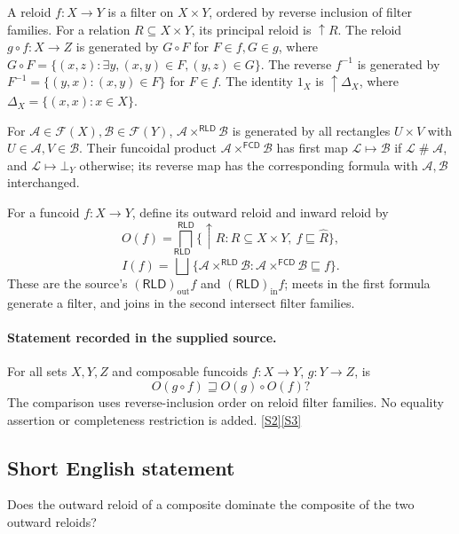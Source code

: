 \documentclass[11pt]{article}
\newcommand{\sref}[2]{\hyperlink{source:#1:#2}{[S#2]}}
\begin{document}
A reloid $f:X\to Y$ is a filter on $X\times Y$, ordered by reverse inclusion of filter families. For a relation $R\subseteq X\times Y$, its principal reloid is $\uparrow R$. The reloid $g\circ f:X\to Z$ is generated by $G\circ F$ for $F\in f,G\in g$, where $G\circ F=\{(x,z):\exists y,(x,y)\in F,(y,z)\in G\}$. The reverse $f^{-1}$ is generated by $F^{-1}=\{(y,x):(x,y)\in F\}$ for $F\in f$. The identity $1_X$ is $\uparrow\Delta_X$, where $\Delta_X=\{(x,x):x\in X\}$.

For $\mathcal A\in\mathcal F(X),\mathcal B\in\mathcal F(Y)$, $\mathcal A\times^{\mathsf{RLD}}\mathcal B$ is generated by all rectangles $U\times V$ with $U\in\mathcal A,V\in\mathcal B$. Their funcoidal product $\mathcal A\times^{\mathsf{FCD}}\mathcal B$ has first map $\mathcal L\mapsto\mathcal B$ if $\mathcal L\mathrel{\#}\mathcal A$, and $\mathcal L\mapsto\bot_Y$ otherwise; its reverse map has the corresponding formula with $\mathcal A,\mathcal B$ interchanged.

For a funcoid $f:X\to Y$, define its outward reloid and inward reloid by
\[
 O(f)=\bigsqcap^{\mathsf{RLD}}\{\uparrow R:R\subseteq X\times Y,\ f\sqsubseteq\widehat R\},
\]
\[
 I(f)=\bigsqcup^{\mathsf{RLD}}\{\mathcal A\times^{\mathsf{RLD}}\mathcal B:
       \mathcal A\times^{\mathsf{FCD}}\mathcal B\sqsubseteq f\}.
\]
These are the source's $(\mathsf{RLD})_{\mathrm{out}}f$ and $(\mathsf{RLD})_{\mathrm{in}}f$; meets in the first formula generate a filter, and joins in the second intersect filter families.
\paragraph{Statement recorded in the supplied source.}
For all sets $X,Y,Z$ and composable funcoids $f:X\to Y$, $g:Y\to Z$, is
\[
 O(g\circ f)\sqsupseteq O(g)\circ O(f)?
\]
The comparison uses reverse-inclusion order on reloid filter families. No equality assertion or completeness restriction is added. \sref{3443}{2}\sref{3443}{3}
\subsection{Short English statement}
Does the outward reloid of a composite dominate the composite of the two outward reloids?
\end{document}
